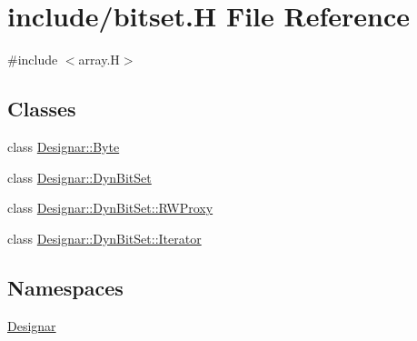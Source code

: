 \hypertarget{bitset_8_h}{}\section{include/bitset.H File Reference}
\label{bitset_8_h}
{\ttfamily \#include $<$array.\+H$>$}\newline
\subsection*{Classes}
\begin{DoxyCompactItemize}
\item 
class \hyperlink{class_designar_1_1_byte}{Designar\+::\+Byte}
\item 
class \hyperlink{class_designar_1_1_dyn_bit_set}{Designar\+::\+Dyn\+Bit\+Set}
\item 
class \hyperlink{class_designar_1_1_dyn_bit_set_1_1_r_w_proxy}{Designar\+::\+Dyn\+Bit\+Set\+::\+R\+W\+Proxy}
\item 
class \hyperlink{class_designar_1_1_dyn_bit_set_1_1_iterator}{Designar\+::\+Dyn\+Bit\+Set\+::\+Iterator}
\end{DoxyCompactItemize}
\subsection*{Namespaces}
\begin{DoxyCompactItemize}
\item 
 \hyperlink{namespace_designar}{Designar}
\end{DoxyCompactItemize}
